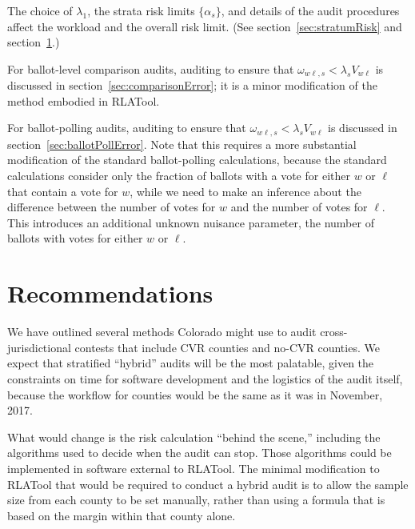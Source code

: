 \documentclass[12pt]{article}
\begin{document}
The choice of $\lambda_1$, the strata risk limits $\{\alpha_s\}$, and details of the
audit procedures affect the workload and the overall risk limit.
(See section~\ref{sec:stratumRisk} and section~\ref{sec:recommendations}.)

For ballot-level comparison audits, auditing to ensure that $\omega_{w\ell,s} < \lambda_s V_{w\ell}$
is discussed in section~\ref{sec:comparisonError}; it is a minor modification of the method
embodied in RLATool.

For ballot-polling audits, auditing to ensure that $\omega_{w\ell,s} < \lambda_s V_{w\ell}$ is discussed in section~\ref{sec:ballotPollError}.
Note that this requires a more substantial modification of the standard ballot-polling calculations,
because the standard calculations consider only the fraction of ballots with a vote for either 
$w$ or $\ell$ that contain a vote for $w$, while we need to make an inference about the 
difference between the number of votes for $w$ and the number of votes for $\ell$.
This introduces an additional unknown nuisance parameter, the number of ballots with votes for either
$w$ or $\ell$.







\section{Recommendations} \label{sec:recommendations}

We have outlined several methods Colorado might use to audit cross-jurisdictional contests
that include CVR counties and no-CVR counties.
We expect that stratified ``hybrid'' audits will be the most palatable,
given the constraints on time for software development and the logistics
of the audit itself, because the workflow for counties would be the same
as it was in November, 2017.

What would change is the risk calculation ``behind the scene,'' including the
algorithms used to decide when the audit can stop.
Those algorithms could be implemented in software external to RLATool.
The minimal modification to RLATool that would be required to conduct
a hybrid audit is to allow the sample size from each county to be set manually,
rather than using a formula that is based on the margin within that county alone.
\end{document}
